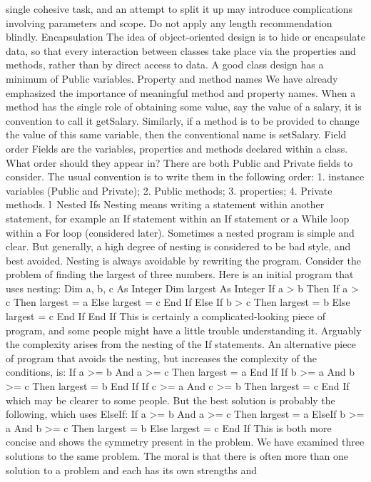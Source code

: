single cohesive task, and an attempt to split it up may introduce complications involving parameters and scope. Do not apply any length recommendation blindly.
Encapsulation
The idea of object-oriented design is to hide or encapsulate data, so that every interaction between classes take place via the properties and methods, rather than by direct access to data. A good class design has a minimum of Public variables.
Property and method names
We have already emphasized the importance of meaningful method and property names. When a method has the single role of obtaining some value, say the value of a salary, it is convention to call it getSalary. Similarly, if a method is to be provided to change the value of this same variable, then the conventional name is setSalary.
Field order
Fields are the variables, properties and methods declared within a class. What order should they appear in? There are both Public and Private ﬁelds to consider. The usual convention is to write them in the following order:
1.	instance variables (Public and Private);
2.	Public methods;
3.	properties;
4.	Private methods.
l Nested Ifs
Nesting means writing a statement within another statement, for example an If statement within an If statement or a While loop within a For loop (considered later). Sometimes a nested program is simple and clear. But generally, a high degree of nesting is considered to be bad style, and best avoided. Nesting is always avoidable by rewriting the program. Consider the problem of ﬁnding the largest of three numbers. Here is an initial program that uses nesting:
Dim a, b, c As Integer
Dim largest As Integer
If a > b Then
	If a > c Then
		largest = a
	Else
		largest = c
	End If
Else
	If b > c Then
		largest = b
	Else
		largest = c
	End If
End If
This is certainly a complicated-looking piece of program, and some people might have a little trouble understanding it. Arguably the complexity arises from the nesting of the If statements.
An alternative piece of program that avoids the nesting, but increases the complexity of the conditions, is:
If a >= b And a >= c Then
	largest = a
End If
If b >= a And b >= c Then
	largest = b
End If
If c >= a And c >= b Then
	largest = c
End If
which may be clearer to some people. But the best solution is probably the following, which uses ElseIf:
If a >= b And a >= c Then
	largest = a
ElseIf b >= a And b >= c Then
	largest = b
Else
	largest = c
End If
This is both more concise and shows the symmetry present in the problem.
We have examined three solutions to the same problem. The moral is that there 
is often more than one solution to a problem and each has its own strengths and 
